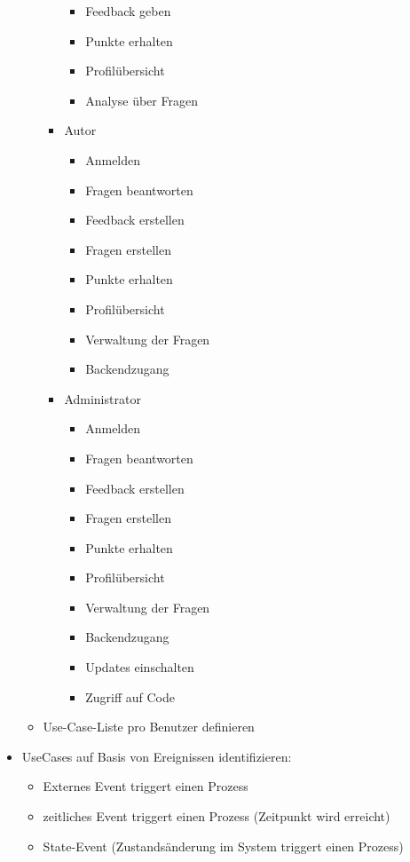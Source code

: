 \begin{itemize}
\begin{itemize}
\begin{itemize}
\begin{itemize}
						\item Feedback geben
						\item Punkte erhalten
						\item Profilübersicht
						\item Analyse über Fragen
					\end{itemize}
				\item Autor
					\begin{itemize}
						\item Anmelden
						\item Fragen beantworten
						\item Feedback erstellen
						\item Fragen erstellen
						\item Punkte erhalten
						\item Profilübersicht
						\item Verwaltung der Fragen
						\item Backendzugang
					\end{itemize}
				\item Administrator
					\begin{itemize}
						\item Anmelden
						\item Fragen beantworten
						\item Feedback erstellen
						\item Fragen erstellen
						\item Punkte erhalten
						\item Profilübersicht
						\item Verwaltung der Fragen
						\item Backendzugang
						\item Updates einschalten
						\item Zugriff auf Code
					\end{itemize}
			\end{itemize} 
		\item Use-Case-Liste pro Benutzer definieren
	\end{itemize}
	\item UseCases auf Basis von Ereignissen identifizieren: 
	\begin{itemize}
		\item Externes Event triggert einen Prozess
		\item zeitliches Event triggert einen Prozess (Zeitpunkt wird erreicht) 
		\item State-Event (Zustandsänderung im System triggert einen Prozess)

\end{itemize}
\end{itemize}
